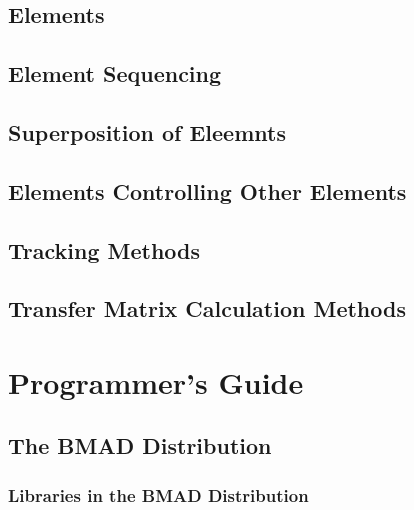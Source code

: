 \documentclass{book}
\begin{document}
\chapter{Elements}

\chapter{Element Sequencing}

\chapter{Superposition of Eleemnts}

\chapter{Elements Controlling Other Elements}

\chapter{Tracking Methods}

\chapter{Transfer Matrix Calculation Methods}

\part{Programmer's Guide}

\chapter{The BMAD Distribution}



\section{Libraries in the BMAD Distribution}
\end{document}
